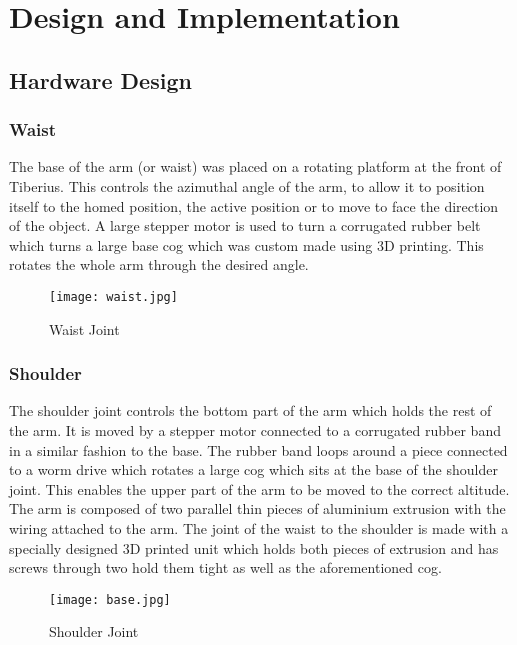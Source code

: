 \section{Design and Implementation}

\subsection{Hardware Design}


\subsubsection{Waist}
The base of the arm (or waist) was placed on a rotating platform at the front of Tiberius.  This controls the azimuthal angle of the arm, to allow it to position itself to the homed position, the active position or to move to face the direction of the object.  A large stepper motor is used to turn a corrugated rubber belt which turns a large base cog which was custom made using 3D printing.  This rotates the whole arm through the desired angle.




\begin{figure}[!htb]
\begin{center}
\texttt{[image: waist.jpg]}
\end{center}
\caption{Waist Joint}
\label{fig:waist}
\end{figure}

\subsubsection{Shoulder}
The shoulder joint controls the bottom part of the arm which holds the rest of the arm.  It is moved by a stepper motor connected to a corrugated rubber band in a similar fashion to the base.  The rubber band loops around a piece connected to a worm drive which rotates a large cog which sits at the base of the shoulder joint.  This enables the upper part of the arm to be moved to the correct altitude.  The arm is composed of two parallel thin pieces of aluminium extrusion with the wiring attached to the arm.  The joint of the waist to the shoulder is made with a specially designed 3D printed unit which holds both pieces of extrusion and has screws through two hold them tight as well as the aforementioned cog.  

\begin{figure}[!htb]
\begin{center}
\texttt{[image: base.jpg]}
\end{center}
\caption{Shoulder Joint}
\label{fig:shoulder}
\end{figure}

